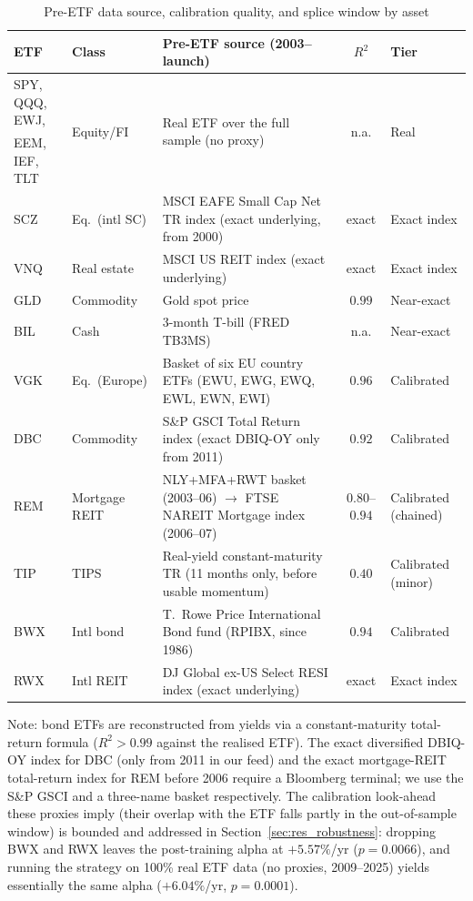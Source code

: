 \begin{table}[H]
\centering
\caption{Pre-ETF data source, calibration quality, and splice window by asset}
\label{tab:proxydetail}
\small
\begin{tabular}{llp{6.0cm}cl}
\toprule
ETF & Class & Pre-ETF source (2003--launch) & $R^2$ & Tier \\
\midrule
SPY, QQQ, EWJ, & \multirow{2}{*}{Equity/FI} & \multirow{2}{*}{Real ETF over the full sample (no proxy)} & \multirow{2}{*}{n.a.} & \multirow{2}{*}{Real} \\
EEM, IEF, TLT  &           &                                          &      &       \\
\midrule
SCZ & Eq.\ (intl SC) & MSCI EAFE Small Cap Net TR index (exact underlying, from 2000) & exact & Exact index \\
VNQ & Real estate    & MSCI US REIT index (exact underlying)            & exact & Exact index \\
GLD & Commodity      & Gold spot price                                  & $0.99$ & Near-exact \\
BIL & Cash           & 3-month T-bill (FRED TB3MS)                       & n.a.  & Near-exact \\
VGK & Eq.\ (Europe)  & Basket of six EU country ETFs (EWU, EWG, EWQ, EWL, EWN, EWI) & $0.96$ & Calibrated \\
DBC & Commodity      & S\&P GSCI Total Return index (exact DBIQ-OY only from 2011) & $0.92$ & Calibrated \\
REM & Mortgage REIT  & NLY+MFA+RWT basket (2003--06) $\to$ FTSE NAREIT Mortgage index (2006--07) & $0.80$--$0.94$ & Calibrated (chained) \\
TIP & TIPS           & Real-yield constant-maturity TR (11 months only, before usable momentum) & $0.40$ & Calibrated (minor) \\
BWX & Intl bond      & T.\ Rowe Price International Bond fund (RPIBX, since 1986) & $0.94$ & Calibrated \\
RWX & Intl REIT      & DJ Global ex-US Select RESI index (exact underlying)  & exact & Exact index \\
\bottomrule
\end{tabular}
\begin{flushleft}
\footnotesize
Note: bond ETFs are reconstructed from yields via a constant-maturity total-return
formula ($R^2>0.99$ against the realised ETF). The exact diversified DBIQ-OY index for
DBC (only from 2011 in our feed) and the exact mortgage-REIT total-return index for
REM before 2006 require a Bloomberg terminal; we use the S\&P GSCI and a three-name
basket respectively. The calibration look-ahead these proxies imply (their overlap with
the ETF falls partly in the out-of-sample window) is bounded and addressed in
Section~\ref{sec:res_robustness}: dropping BWX and RWX leaves the post-training alpha at
$+5.57\%$/yr ($p=0.0066$), and running the strategy on 100\% real ETF data (no proxies,
2009--2025) yields essentially the same alpha ($+6.04\%$/yr, $p=0.0001$).
\end{flushleft}
\end{table}
